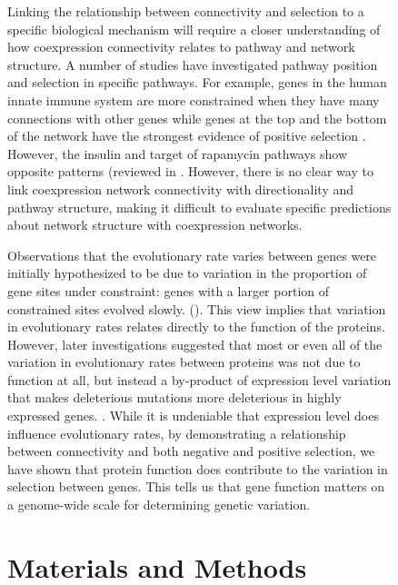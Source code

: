 \begin{figure}[ht!]
Linking the relationship between connectivity and selection to a specific biological mechanism will require a closer understanding of how coexpression connectivity relates to pathway and network structure. A number of studies have investigated pathway position and selection in specific pathways. For example, genes in the human innate immune system are more constrained when they have many connections with other genes while genes at the top and the bottom of the network have the strongest evidence of positive selection \citep{Casals2011-jz}. However, the insulin and target of rapamycin pathways show opposite patterns (reviewed in \citep{Olson-Manning2013-op}. However, there is no clear way to link coexpression network connectivity with directionality and pathway structure, making it difficult to evaluate specific predictions about network structure with coexpression networks.

Observations that the evolutionary rate varies between genes were initially hypothesized to be due to variation in the proportion of gene sites under constraint: genes with a larger portion of constrained sites evolved slowly. (\citep{Kimura1977-ib}). This view implies that variation in evolutionary rates relates directly to the function of the proteins. However, later investigations suggested that most or even all of the variation in evolutionary rates between proteins was not due to function at all, but instead a by-product of expression level variation that makes deleterious mutations more deleterious in highly expressed genes. \citep{Drummond2006-pa,Zhang2015-ne}. While it is undeniable that expression level does influence evolutionary rates, by demonstrating a relationship between connectivity and both negative and positive selection, we have shown that protein function does contribute to the variation in selection between genes. This tells us that gene function matters on a genome-wide scale for determining genetic variation. 


\section{Materials and Methods}


\end{figure}
